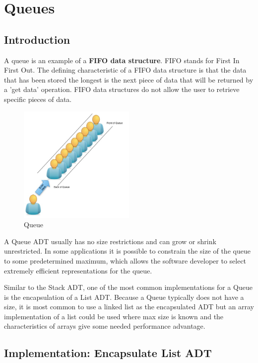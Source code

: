 

\chapter{Queues}
\section{Introduction}

A queue is an example of a \textbf{FIFO data structure}. FIFO stands for First In First Out.   The defining characteristic of a FIFO data structure is that 
the data that has been stored the longest is the next piece of data that will be returned by a 'get data' operation. FIFO data structures do not allow the user to retrieve specific pieces of data.


\begin{figure}[H]
\centering
\includegraphics[width=0.5\textwidth]{pictures/queue.jpg}
\caption{Queue}
\label{fig:queue}
\end{figure}

A Queue ADT usually has no size restrictions and can grow or shrink unrestricted. In some applications it is possible to constrain the size of the queue to some predetermined maximum, which allows the software developer to select extremely efficient representations for the queue.

Similar to the Stack ADT, one of the most common implementations for a Queue is the encapsulation of a List ADT.   Because a Queue typically does not have a size, it is most common to use a linked list as the encapsulated ADT but an array implementation of a list could be used where max size is known and the characteristics of arrays give some needed performance advantage.

\section{Implementation: Encapsulate List ADT}

